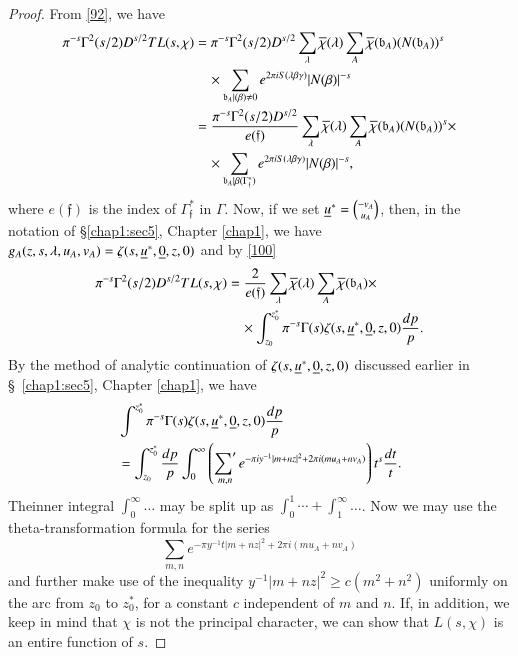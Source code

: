 \begin{proof}
From \eqref{92}, we have
\begin{align*}
\pi^{-s}\Gamma^{2}(s/2)D^{s/2}TL(s,\chi) &=
\pi^{-s}\Gamma^{2}(s/2)D^{s/2}\sum_{\lambda}\overline{\chi}(\lambda)\sum_{A}\overline{\chi}(\mathfrak{b}_{A})(N(\mathfrak{b}_{A}))^{s}\\ 
&\quad \times \sum_{\mathfrak{b}_{A}|(\beta)\neq 0}e^{2\pi
  iS(\lambda\beta\gamma)}|N(\beta)|^{-s}\\
&=
\frac{\pi^{-s}\Gamma^{2}(s/2)D^{s/2}}{e(\mathfrak{f})}\sum_{\lambda}\overline{\chi}(\lambda)\sum_{A}\overline{\chi}(\mathfrak{b}_{A})(N(\mathfrak{b}_{A}))^{s}\times\\
&\quad \times
\sum_{\mathfrak{b}_{A}|\beta(\Gamma^{\ast}_{\mathfrak{f}})} e^{2\pi i
  S (\lambda \beta \gamma)} |N (\beta)|^{-s},
\end{align*}
where $e(\mathfrak{f})$ is the index of $\Gamma^{\ast}_{\mathfrak{f}}$
in $\Gamma$. Now, if we set $\underline{u}^{\ast}=\binom{-v_{A}}{u_{A}}$,
then, in the notation of \S \ref{chap1:sec5}, Chapter \ref{chap1}, we have
$g_{A}(z,s,\lambda,u_{A},v_{A})=\zeta(s,\underline{u}^{\ast},\underline{0},z,0)$ and
by \eqref{100}
\begin{align*}
\pi^{-s}\Gamma^{2}(s/2)D^{s/2}TL(s,\chi) &=
\frac{2}{e(\mathfrak{f})}\sum_{\lambda}\overline{\chi}(\lambda)\sum_{A}\overline{\chi}(\mathfrak{b}_{A})\times\\
&\quad \times
\int^{z^{\ast}_{0}}_{z_{0}}\pi^{-s}\Gamma(s)\zeta(s,\underline{u}^{\ast},\underline{0},z,0)\frac{dp}{p}. 
\end{align*}
By the method of analytic continuation of
$\zeta(s,\underline{u}^{\ast},\underline{0},z,0)$ discussed earlier in \S\ \ref{chap1:sec5},
Chapter \ref{chap1}, we have
\begin{align*}
&
  \int^{z^{\ast}_{0}}\pi^{-s}\Gamma(s)\zeta(s,\underline{u}^{\ast},\underline{0},z,0)\frac{dp}{p}\\
&=
  \int^{z^{\ast}_{0}}_{z_{0}}\frac{dp}{p}\int^{\infty}_{0}\left(\mathop{{\sum}'}_{m,n}e^{-\pi
    iy^{-1}|m+nz|^{2}+2\pi i(mu_{A}+nv_{A})}\right)t^{s}\frac{dt}{t}. 
\end{align*}
The\pageoriginale inner integral $\int^{\infty}_{0}\ldots$ may be
split up as $\int^{1}_{0}\cdots+\int^{\infty}_{1}\ldots$. Now we may
use the theta-transformation formula for the series
$$\sum\limits_{m,n}e^{-\pi y^{-1}t|m+nz|^{2}+2\pi i(mu_{A}+nv_{A})}$$
and further make use of the inequality $y^{-1}|m+nz|^{2}\geq
c(m^{2}+n^{2})$ uniformly on the arc from $z_{0}$ to $z^{\ast}_{0}$,
for a constant $c$ independent of $m$ and $n$. If, in addition, we
keep in mind that $\chi$ is not the principal character, we can show
that $L(s,\chi)$ is an entire function of $s$.
\end{proof}

